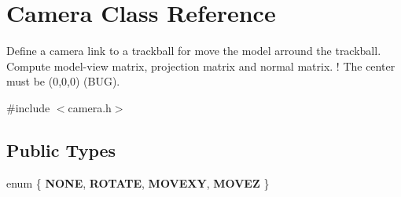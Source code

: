 \hypertarget{class_camera}{}\section{Camera Class Reference}
\label{class_camera}


Define a camera link to a trackball for move the model arround the trackball. Compute model-\/view matrix, projection matrix and normal matrix. ! The center must be (0,0,0) (B\+UG).  




{\ttfamily \#include $<$camera.\+h$>$}

\subsection*{Public Types}
\begin{DoxyCompactItemize}
\item 
\mbox{\label{class_camera_a23162b5412510d749aad470789806872}} 
enum \{ {\bfseries N\+O\+NE}, 
{\bfseries R\+O\+T\+A\+TE}, 
{\bfseries M\+O\+V\+E\+XY}, 
{\bfseries M\+O\+V\+EZ}
 \}
\end{DoxyCompactItemize}
